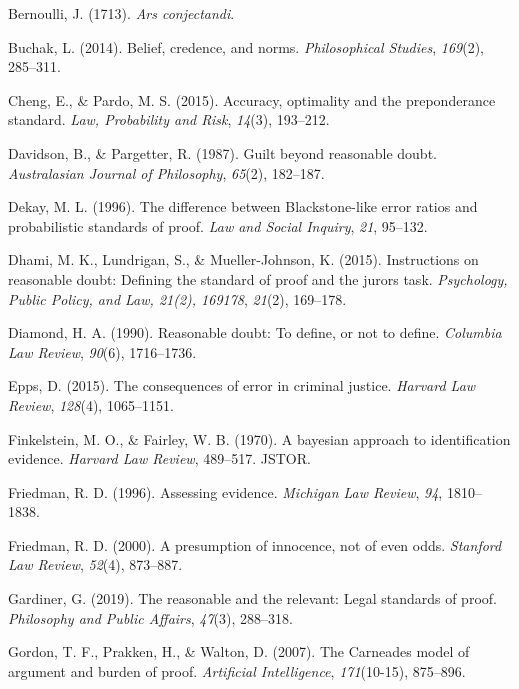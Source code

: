 \documentclass[10pt,dvipsnames]{scrartcl}
\begin{document}
\hypertarget{ref-Bernoulli1713Ars-conjectandi}{}
Bernoulli, J. (1713). \emph{Ars conjectandi}.

\hypertarget{ref-buchak2014belief}{}
Buchak, L. (2014). Belief, credence, and norms. \emph{Philosophical
Studies}, \emph{169}(2), 285--311.

\hypertarget{ref-cheng2015}{}
Cheng, E., \& Pardo, M. S. (2015). Accuracy, optimality and the
preponderance standard. \emph{Law, Probability and Risk}, \emph{14}(3),
193--212.

\hypertarget{ref-davidsonpargetter1987}{}
Davidson, B., \& Pargetter, R. (1987). Guilt beyond reasonable doubt.
\emph{Australasian Journal of Philosophy}, \emph{65}(2), 182--187.

\hypertarget{ref-Dekay1996}{}
Dekay, M. L. (1996). The difference between Blackstone-like error ratios
and probabilistic standards of proof. \emph{Law and Social Inquiry},
\emph{21}, 95--132.

\hypertarget{ref-dhamiEtAl2015}{}
Dhami, M. K., Lundrigan, S., \& Mueller-Johnson, K. (2015). Instructions
on reasonable doubt: Defining the standard of proof and the jurors task.
\emph{Psychology, Public Policy, and Law, 21(2), 169178}, \emph{21}(2),
169--178.

\hypertarget{ref-diamond90}{}
Diamond, H. A. (1990). Reasonable doubt: To define, or not to define.
\emph{Columbia Law Review}, \emph{90}(6), 1716--1736.

\hypertarget{ref-epps2015}{}
Epps, D. (2015). The consequences of error in criminal justice.
\emph{Harvard Law Review}, \emph{128}(4), 1065--1151.

\hypertarget{ref-finkelstein1970bayesian}{}
Finkelstein, M. O., \& Fairley, W. B. (1970). A bayesian approach to
identification evidence. \emph{Harvard Law Review}, 489--517. JSTOR.

\hypertarget{ref-friedman1996}{}
Friedman, R. D. (1996). Assessing evidence. \emph{Michigan Law Review},
\emph{94}, 1810--1838.

\hypertarget{ref-Friedman2000presumption}{}
Friedman, R. D. (2000). A presumption of innocence, not of even odds.
\emph{Stanford Law Review}, \emph{52}(4), 873--887.

\hypertarget{ref-gardiner2019ppa}{}
Gardiner, G. (2019). The reasonable and the relevant: Legal standards of
proof. \emph{Philosophy and Public Affairs}, \emph{47}(3), 288--318.

\hypertarget{ref-gordon2007}{}
Gordon, T. F., Prakken, H., \& Walton, D. (2007). The Carneades model of
argument and burden of proof. \emph{Artificial Intelligence},
\emph{171}(10-15), 875--896.
\end{document}
